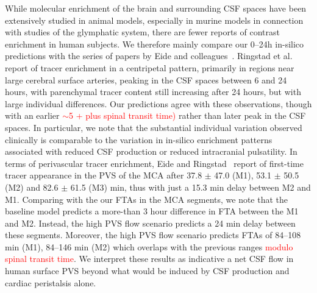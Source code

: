 \documentclass[fleqn,10pt]{wlscirep}
\newcommand{\discuss}[1]{\textcolor{red}{#1}}
\begin{document}
While molecular enrichment of the brain and surrounding CSF spaces
have been extensively studied in animal models, especially in murine
models in connection with studies of the glymphatic system, there are
fewer reports of contrast enrichment in human subjects. We therefore
mainly compare our 0--24h in-silico predictions with the series of papers
by Eide and colleagues~\cite{ringstad2017glymphatic,
  ringstad2018brain, eide2021sleep, eide2024functional}. Ringstad et
al.~\cite{ringstad2018brain} report of tracer enrichment in a
centripetal pattern, primarily in regions near large cerebral surface
arteries, peaking in the CSF spaces between 6 and 24 hours, with
parenchymal tracer content still increasing after 24 hours, but with
large individual differences. Our predictions agree with these
observations, though with an earlier \discuss{$\sim$5 + plus spinal
  transit time)} rather than later peak in the CSF spaces. In
particular, we note that the substantial individual variation observed
clinically is comparable to the variation in in-silico enrichment
patterns associated with reduced CSF production or reduced
intracranial pulsatility. In terms of perivascular tracer enrichment,
Eide and Ringstad~\cite{eide2024functional} report of first-time
tracer appearance in the PVS of the MCA after 37.8 $\pm$ 47.0 (M1),
53.1 $\pm$ 50.5 (M2) and 82.6 $\pm$ 61.5 (M3) min, thus with just a
15.3 min delay between M2 and M1. Comparing with the our FTAs in the
MCA segments, we note that the baseline model predicts a more-than 3
hour difference in FTA between the M1 and M2. Instead, the high PVS
flow scenario predicts a 24 min delay between these
segments. Moreover, the high PVS flow scenario predicts FTAs of
84--108 min (M1), 84--146 min (M2) which overlaps with the previous
ranges \discuss{modulo spinal transit time}. We interpret these
results as indicative a net CSF flow in human surface PVS beyond what
would be induced by CSF production and cardiac peristalsis alone.
\end{document}
